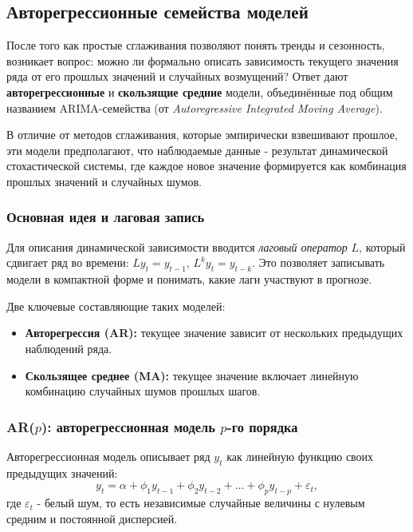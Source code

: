 \documentclass[12pt,a4paper]{article}
\begin{document}
\subsection{Авторегрессионные семейства моделей}

После того как простые сглаживания позволяют понять тренды и сезонность, возникает вопрос: можно ли формально описать зависимость текущего значения ряда от его прошлых значений и случайных возмущений? Ответ дают \textbf{авторегрессионные} и \textbf{скользящие средние} модели, объединённые под общим названием ARIMA-семейства (от \textit{Autoregressive Integrated Moving Average}).

В отличие от методов сглаживания, которые эмпирически взвешивают прошлое, эти модели предполагают, что наблюдаемые данные - результат динамической стохастической системы, где каждое новое значение формируется как комбинация прошлых значений и случайных шумов.

\subsubsection{Основная идея и лаговая запись}

Для описания динамической зависимости вводится \emph{лаговый оператор} $L$, который сдвигает ряд во времени: $Ly_t = y_{t-1}$, $L^k y_t = y_{t-k}$.
Это позволяет записывать модели в компактной форме и понимать, какие лаги участвуют в прогнозе.

Две ключевые составляющие таких моделей:
\begin{itemize}
    \item \textbf{Авторегрессия (AR):} текущее значение зависит от нескольких предыдущих наблюдений ряда.
    \item \textbf{Скользящее среднее (MA):} текущее значение включает линейную комбинацию случайных шумов прошлых шагов.
\end{itemize}

\subsubsection{AR($p$): авторегрессионная модель $p$-го порядка}

Авторегрессионная модель описывает ряд $y_t$ как линейную функцию своих предыдущих значений:
\[
y_t = \alpha + \phi_1 y_{t-1} + \phi_2 y_{t-2} + \dots + \phi_p y_{t-p} + \varepsilon_t,
\]
где $\varepsilon_t$ - белый шум, то есть независимые случайные величины с нулевым средним и постоянной дисперсией.
\end{document}
